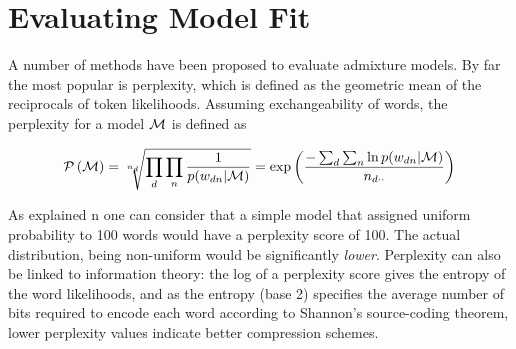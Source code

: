 %
%


\section{Evaluating Model Fit}
\label{sec:chap1:eval}

A number of methods have been proposed to evaluate admixture models. By far the most popular is perplexity, which is defined as the geometric mean of the reciprocals of token likelihoods. Assuming exchangeability of words, the perplexity for a model $\mathcal{M}$ is defined as

\begin{align}
\mathcal{P} \left( { \mathcal{M} } \right) = \sqrt[n_{d}]{\prod_d \prod_n \frac{1}{p(w_{dn}|\mathcal{M})}} = \exp \left( \frac{-\sum_d \sum_n \ln p(w_{dn}|\mathcal{M})}{n_{d\cdot\cdot}} \right) \label{eqn:perp_def}
\end{align}

As explained n \cite{Goodman2001} one can consider that a simple model that assigned uniform probability to 100 words would have a perplexity score of 100. The actual distribution, being non-uniform would be significantly \emph{lower}. Perplexity can also be linked to information theory: the log of a perplexity score gives the entropy of the word likelihoods, and as the entropy (base 2) specifies the average number of bits required to encode each word according to Shannon's source-coding theorem, lower perplexity values indicate better compression schemes.


